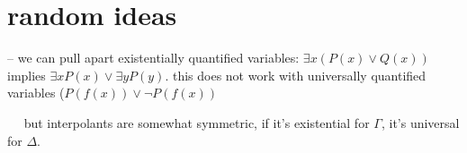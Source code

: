 \documentclass[,%
	draft=false,%
	numbers=noendperiod
	11pt,
	a4paper,
	oneside,%
	openany,
]{memoir}
\begin{document}
	\section{random ideas}

	-- we can pull apart existentially quantified variables: $\exists x (P(x) \lor Q(x))$ implies $\exists x P(x) \lor \exists y P(y)$. this does not work with universally quantified variables ($P(f(x)) \lor \lnot P(f(x))$

	$\quad$ but interpolants are somewhat symmetric, if it's existential for $\Gamma$, it's universal for $\Delta$.




	
\end{document}
